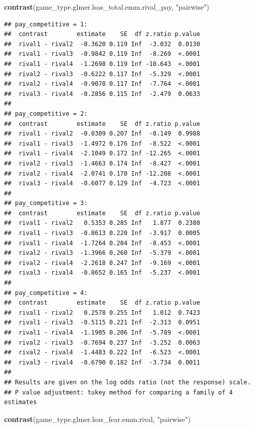 \documentclass[
]{article}
\newenvironment{Shaded}{\begin{snugshade}}{\end{snugshade}}
\newcommand{\FunctionTok}[1]{\textcolor[rgb]{0.13,0.29,0.53}{\textbf{#1}}}
\newcommand{\NormalTok}[1]{#1}
\newcommand{\StringTok}[1]{\textcolor[rgb]{0.31,0.60,0.02}{#1}}
\begin{document}
\begin{Shaded}
\begin{Highlighting}[]
\FunctionTok{contrast}\NormalTok{(game\_type.glmer.lsas\_total.emm.rival\_pay, }\StringTok{"pairwise"}\NormalTok{)}
\end{Highlighting}
\end{Shaded}

\begin{verbatim}
## pay_competitive = 1:
##  contrast        estimate    SE  df z.ratio p.value
##  rival1 - rival2  -0.3620 0.119 Inf  -3.032  0.0130
##  rival1 - rival3  -0.9842 0.119 Inf  -8.269  <.0001
##  rival1 - rival4  -1.2698 0.119 Inf -10.643  <.0001
##  rival2 - rival3  -0.6222 0.117 Inf  -5.329  <.0001
##  rival2 - rival4  -0.9078 0.117 Inf  -7.764  <.0001
##  rival3 - rival4  -0.2856 0.115 Inf  -2.479  0.0633
## 
## pay_competitive = 2:
##  contrast        estimate    SE  df z.ratio p.value
##  rival1 - rival2  -0.0309 0.207 Inf  -0.149  0.9988
##  rival1 - rival3  -1.4972 0.176 Inf  -8.522  <.0001
##  rival1 - rival4  -2.1049 0.172 Inf -12.265  <.0001
##  rival2 - rival3  -1.4663 0.174 Inf  -8.427  <.0001
##  rival2 - rival4  -2.0741 0.170 Inf -12.208  <.0001
##  rival3 - rival4  -0.6077 0.129 Inf  -4.723  <.0001
## 
## pay_competitive = 3:
##  contrast        estimate    SE  df z.ratio p.value
##  rival1 - rival2   0.5353 0.285 Inf   1.877  0.2380
##  rival1 - rival3  -0.8613 0.220 Inf  -3.917  0.0005
##  rival1 - rival4  -1.7264 0.204 Inf  -8.453  <.0001
##  rival2 - rival3  -1.3966 0.260 Inf  -5.379  <.0001
##  rival2 - rival4  -2.2618 0.247 Inf  -9.169  <.0001
##  rival3 - rival4  -0.8652 0.165 Inf  -5.237  <.0001
## 
## pay_competitive = 4:
##  contrast        estimate    SE  df z.ratio p.value
##  rival1 - rival2   0.2578 0.255 Inf   1.012  0.7423
##  rival1 - rival3  -0.5115 0.221 Inf  -2.313  0.0951
##  rival1 - rival4  -1.1905 0.206 Inf  -5.789  <.0001
##  rival2 - rival3  -0.7694 0.237 Inf  -3.252  0.0063
##  rival2 - rival4  -1.4483 0.222 Inf  -6.523  <.0001
##  rival3 - rival4  -0.6790 0.182 Inf  -3.734  0.0011
## 
## Results are given on the log odds ratio (not the response) scale. 
## P value adjustment: tukey method for comparing a family of 4 estimates
\end{verbatim}

\begin{Shaded}
\begin{Highlighting}[]
\FunctionTok{contrast}\NormalTok{(game\_type.glmer.lsas\_fear.emm.rival, }\StringTok{"pairwise"}\NormalTok{)}
\end{Highlighting}
\end{Shaded}
\end{document}
